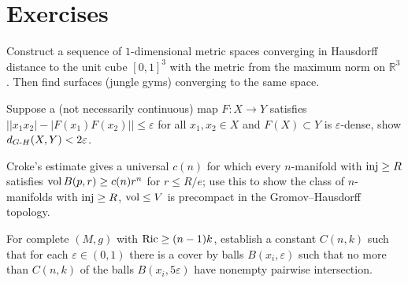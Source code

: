 \section{Exercises}

\begin{remark}
  \label{rem:pet-ch11-exercise-11-6-1}

  Construct a sequence of $1$-dimensional metric spaces converging in Hausdorff
  distance to the unit cube $[0,1]^3$ with the metric from the maximum norm on
  $\mathbb{R}^3$. Then find surfaces (jungle gyms) converging to the same
  space.
\end{remark}

\begin{remark}
  \label{rem:pet-ch11-exercise-11-6-2}

  Suppose a (not necessarily continuous) map $F:X\to Y$ satisfies
  $\big||x_1x_2|-|F(x_1)F(x_2)|\big|\le\varepsilon$ for all $x_1,x_2\in X$ and
  $F(X)\subset Y$ is $\varepsilon$-dense, show $d_{G\text{-}H}(X,Y)<2\varepsilon$.
\end{remark}

\begin{remark}
  \label{rem:pet-ch11-exercise-11-6-3}

  Croke's estimate gives a universal $c(n)$ for which every $n$-manifold
  with $\operatorname{inj}\ge R$ satisfies $\operatorname{vol} B(p,r)\ge c(n)r^n$ for $r\le R/e$; use this
  to show the class of $n$-manifolds with $\operatorname{inj}\ge R$, $\operatorname{vol}\le V$ is
  precompact in the Gromov--Hausdorff topology.
\end{remark}

\begin{remark}
  \label{rem:pet-ch11-exercise-11-6-4}

  For complete $(M,g)$ with $\operatorname{Ric}\ge(n-1)k$, establish a constant
  $C(n,k)$ such that for each $\varepsilon\in(0,1)$ there is a cover by balls
  $B(x_i,\varepsilon)$ such that no more than $C(n,k)$ of the balls
  $B(x_i,5\varepsilon)$ have nonempty pairwise intersection.
\end{remark}

